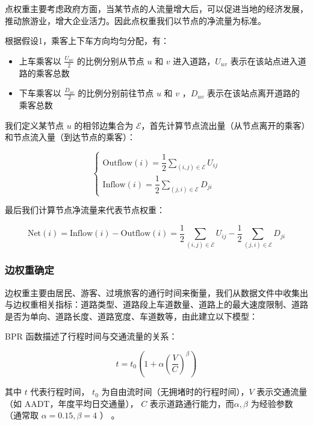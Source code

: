 \documentclass[12pt, a4paper, oneside]{ctexart}
\begin{document}
点权重主要考虑政府方面，当某节点的人流量增大后，可以促进当地的经济发展，推动旅游业，增大企业活力。因此点权重我们以节点的净流量为标准。

根据假设1，乘客上下车方向均匀分配，有：

\begin{itemize}
  \item 上车乘客以 \(\frac{U_{uv}}{2}\) 的比例分别从节点 \(u\) 和 \(v\) 进入道路，\(U_{uv}\) 表示在该站点进入道路的乘客总数
  \item 下车乘客以 \(\frac{D_{uv}}{2}\) 的比例分别前往节点 \(u\) 和 \(v\) ，\(D_{uv}\) 表示在该站点离开道路的乘客总数
\end{itemize}

我们定义某节点 \(u\) 的相邻边集合为 \(\mathcal{E}\)，首先计算节点流出量（从节点离开的乘客）和节点流入量（到达节点的乘客）：

\begin{equation}
  \begin{cases} 
  \text{Outflow}(i) = \dfrac{1}{2} \sum_{(i, j) \in \mathcal{E}} U_{ij} \\
  \text{Inflow}(i) = \dfrac{1}{2} \sum_{(j, i) \in \mathcal{E}} D_{ji} 
  \end{cases}
\end{equation}

最后我们计算节点净流量来代表节点权重：

\begin{equation}
\text{Net}(i) = \text{Inflow}(i) - \text{Outflow}(i)=\frac{1}{2} \sum_{(i, j) \in \mathcal{E}} U_{ij}-\frac{1}{2} \sum_{(j, i) \in \mathcal{E}} D_{ji}
\end{equation}

\subsubsection{边权重确定}

边权重主要由居民、游客、过境旅客的通行时间来衡量，我们从数据文件中收集出与边权重相关指标：道路类型、道路段上车道数量、道路上的最大速度限制、道路是否为单向、道路长度、道路宽度、车道数等，由此建立以下模型：

BPR 函数描述了行程时间与交通流量的关系：

\begin{equation}
t = t_0 \left(1 + \alpha \left(\frac{V}{C}\right)^\beta\right)
\end{equation}

其中 \(t\) 代表行程时间， \(t_0\) 为自由流时间（无拥堵时的行程时间），\(V\) 表示交通流量（如 AADT，年度平均日交通量）， \(C\) 表示道路通行能力，而\(\alpha, \beta\) 为经验参数（通常取 \(\alpha=0.15 , \beta=4\) ）\cite{hamdouch2014} \cite{gao2004}。
\end{document}
